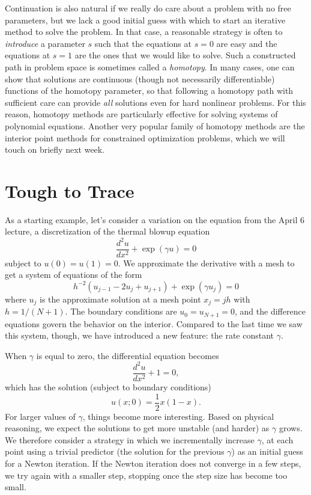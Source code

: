 \documentclass[12pt, leqno]{article} %
\begin{document}
Continuation is also natural if we really do care about a problem with no free
parameters, but we lack a good initial guess with which to start an
iterative method to solve the problem.  In that case, a reasonable
strategy is often to {\em introduce} a parameter $s$ such that the
equations at $s = 0$ are easy and the equations at $s = 1$ are the
ones that we would like to solve.  Such a constructed path in problem
space is sometimes called a {\em homotopy}.  In many cases, one can
show that solutions are continuous (though not necessarily
differentiable) functions of the homotopy parameter, so that following
a homotopy path with sufficient care can provide {\em all} solutions
even for hard nonlinear problems.  For this reason, homotopy methods
are particularly effective for solving systems of polynomial
equations.  Another very popular family of homotopy methods are the
interior point methods for constrained optimization problems,
which we will touch on briefly next week.

\section*{Tough to Trace}

As a starting example, let's consider a variation on
the equation from the April 6 lecture, a discretization
of the thermal blowup equation
\[
  \frac{d^2 u}{dx^2} + \exp(\gamma u) = 0
\]
subject to $u(0) = u(1) = 0$.  We approximate the derivative
with a mesh to get a system of equations of the form
\[
  h^{-2} \left( u_{j-1}-2u_j+u_{j+1} \right) + \exp(\gamma u_j) = 0
\]
where $u_j$ is the approximate solution at a mesh point $x_j = jh$
with $h = 1/(N+1)$.  The boundary conditions are $u_0 = u_{N+1} = 0$,
and the difference equations govern the behavior on the interior.
Compared to the last time we saw this system, though, we have
introduced a new feature: the rate constant $\gamma$.

When $\gamma$ is equal to zero, the differential equation becomes
\[
  \frac{d^2 u}{dx^2} + 1 = 0,
\]
which has the solution (subject to boundary conditions)
\[
  u(x; 0) = \frac{1}{2} x(1-x).
\]
For larger values of $\gamma$, things become more interesting.
Based on physical reasoning, we expect the solutions to get more
unstable (and harder) as $\gamma$ grows.  We therefore consider
a strategy in which we incrementally increase $\gamma$, at each
point using a trivial predictor (the solution for the previous
$\gamma$) as an initial guess for a Newton iteration.  If the
Newton iteration does not converge in a few steps, we try again
with a smaller step, stopping once the step size has become too small.
\end{document}
